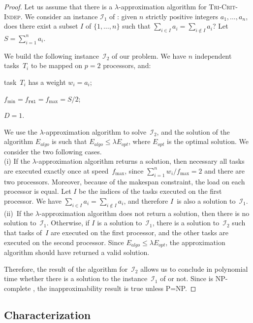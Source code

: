 \documentclass[a4paper]{article}
\theoremstyle{plain}
\theoremstyle{definition}
\theoremstyle{remark}
\newcommand{\fmax}{\ensuremath{f_{\max}}\xspace}
\newcommand{\fmin}{\ensuremath{f_{\min}}\xspace}
\newcommand{\fr}{\ensuremath{f_{\texttt{rel}}}\xspace}
\newcommand\II{\ensuremath{\mathcal{I}}\xspace}
\newcommand{\indep}{\textsc{Tri-Crit-In\-dep}\xspace}
\begin{document}
\begin{proof}
Let us assume that there is a $\lambda$-approxi\-mation algorithm for
\indep. 
We consider an instance $\II_1$ of \partition: given $n$ strictly positive 
integers $a_1, \ldots, a_n$, does there exist a subset $I$ of $\{1,\ldots, n\}$ 
such that $\sum_{i\in I}a_i= \sum_{i \notin I} a_i$? Let
$S=\sum_{i=1}^n a_i$.

We build the following instance~$\II_2$ of our problem. We have $n$ 
independent tasks~$T_i$ to be mapped on $p=2$ processors, and: 
\begin{compactitem}
\item task~$T_i$ has a weight $w_i=a_i$;
\item $\fmin= \fr = \fmax = S/2$; 
\item $D = 1$.
\end{compactitem}

\medskip
We use the $\lambda$-approxi\-mation algorithm to solve~$\II_2$, and the
solution of the algorithm $E_{algo}$ is such that $E_{algo}\leq
\lambda E_{opt}$, where $E_{opt}$ is the optimal solution. 
We consider the two following cases.\\ 
(i) If the $\lambda$-approxi\-mation algorithm returns a solution, then
necessary all tasks are executed exactly once at speed~\fmax, since
$\sum_{i=1}^n w_i/\fmax = 2$ and there are two processors. Moreover,
because of the makespan constraint, the load on each processor is
equal. Let $I$ be the indices of the tasks executed on the first
processor. We have $\sum_{i\in I}a_i= \sum_{i \notin I} a_i$, and
therefore $I$~is also a solution to~$\II_1$. \\
(ii)~If  the $\lambda$-approxi\-mation algorithm does not return a
solution, then there is no solution to~$\II_1$. Otherwise, if $I$ is a
solution to~$\II_1$, there is a solution to~$\II_2$ such that tasks
of~$I$ are executed on the first processor, and the other tasks are
executed on the second processor. Since $E_{algo}\leq \lambda E_{opt}$,
the approximation algorithm should have returned a valid solution.  

Therefore, the result of the algorithm for~$\II_2$ allows us to
conclude in polynomial time whether there is a solution to the
instance~$\II_1$ of \partition or not. Since \partition is
NP-complete \cite{GareyJohnson}, the inapproximability result is true
unless P=NP. 
\end{proof}



\subsection{Characterization}
\label{char.indep}
\end{document}

